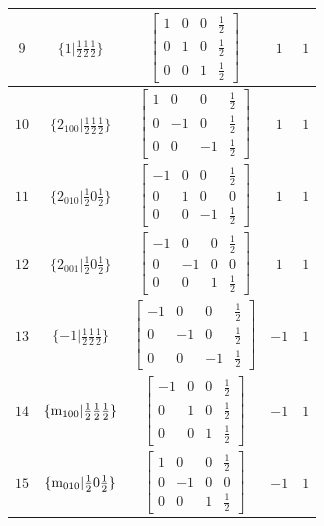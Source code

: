 \documentclass[fleqn,8pt]{jsarticle}
\begin{document}
\begin{longtable}{ccccc}
$ 9 $ & $ \{1|\frac{1}{2} \frac{1}{2} \frac{1}{2}\} $ & $ \begin{bmatrix} 1 & 0 & 0 & \frac{1}{2} \\ 0 & 1 & 0 & \frac{1}{2} \\ 0 & 0 & 1 & \frac{1}{2} \end{bmatrix} $ & $ 1 $ & $ 1 $ \\ \hline
$ 10 $ & $ \{2{}_{100}|\frac{1}{2} \frac{1}{2} \frac{1}{2}\} $ & $ \begin{bmatrix} 1 & 0 & 0 & \frac{1}{2} \\ 0 & -1 & 0 & \frac{1}{2} \\ 0 & 0 & -1 & \frac{1}{2} \end{bmatrix} $ & $ 1 $ & $ 1 $ \\ \hline
$ 11 $ & $ \{2{}_{010}|\frac{1}{2} 0 \frac{1}{2}\} $ & $ \begin{bmatrix} -1 & 0 & 0 & \frac{1}{2} \\ 0 & 1 & 0 & 0 \\ 0 & 0 & -1 & \frac{1}{2} \end{bmatrix} $ & $ 1 $ & $ 1 $ \\ \hline
$ 12 $ & $ \{2{}_{001}|\frac{1}{2} 0 \frac{1}{2}\} $ & $ \begin{bmatrix} -1 & 0 & 0 & \frac{1}{2} \\ 0 & -1 & 0 & 0 \\ 0 & 0 & 1 & \frac{1}{2} \end{bmatrix} $ & $ 1 $ & $ 1 $ \\ \hline
$ 13 $ & $ \{-1|\frac{1}{2} \frac{1}{2} \frac{1}{2}\} $ & $ \begin{bmatrix} -1 & 0 & 0 & \frac{1}{2} \\ 0 & -1 & 0 & \frac{1}{2} \\ 0 & 0 & -1 & \frac{1}{2} \end{bmatrix} $ & $ -1 $ & $ 1 $ \\ \hline
$ 14 $ & $ \{{\rm m}_{100}|\frac{1}{2} \frac{1}{2} \frac{1}{2}\} $ & $ \begin{bmatrix} -1 & 0 & 0 & \frac{1}{2} \\ 0 & 1 & 0 & \frac{1}{2} \\ 0 & 0 & 1 & \frac{1}{2} \end{bmatrix} $ & $ -1 $ & $ 1 $ \\ \hline
$ 15 $ & $ \{{\rm m}_{010}|\frac{1}{2} 0 \frac{1}{2}\} $ & $ \begin{bmatrix} 1 & 0 & 0 & \frac{1}{2} \\ 0 & -1 & 0 & 0 \\ 0 & 0 & 1 & \frac{1}{2} \end{bmatrix} $ & $ -1 $ & $ 1 $ \\ \hline

\end{longtable}
\end{document}
